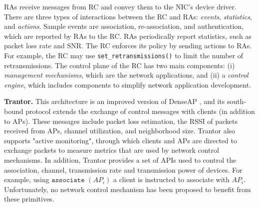 RAs receive messages from RC and convey them to the NIC's device driver.
There are three types of interactions between the RC and RAs: \textit{events}, \textit{statistics}, and \textit{actions}.
Sample events are association, re-association, and authentication, which are reported by RAs to the RC.
RAs periodically report statistics, such as packet loss rate and SNR.
The RC enforces its policy by sending actions to RAs.
For example, the RC may use \texttt{set\_retransmissions()} to limit the number of retransmissions.
The control plane of the RC has two main components: (i) \textit{management mechanisms}, which are the network applications, and (ii) a \textit{control engine}, which includes components to simplify network application development.



\textbf{Trantor. }
This architecture \cite{Trantor} is an improved version of DenseAP \cite{DenseAP}, and its south-bound protocol extends the exchange of control messages with clients (in addition to APs).
These messages include packet loss estimation, the RSSI of packets received from APs, channel utilization, and neighborhood size. 
Trantor also supports "active monitoring", through which clients and APs are directed to exchange packets to measure metrics that are used by network control mechanisms.
In addition, Trantor provides a set of APIs used to control the association, channel, transmission rate and transmission power of devices.
For example, using $\texttt{associate }(AP_{i})$ a client is instructed to associate with $AP_{i}$. 
Unfortunately, no network control mechanism has been proposed to benefit from these primitives.



